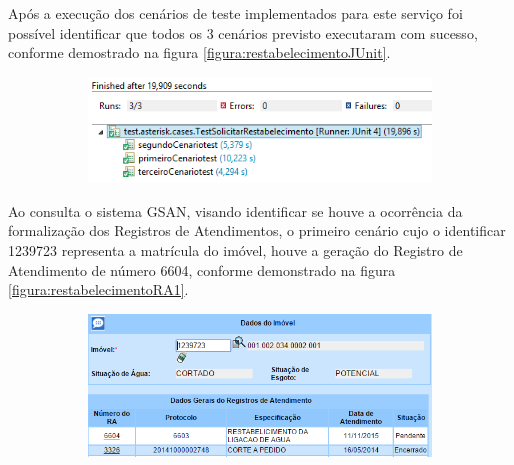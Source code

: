  Após a execução dos cenários de teste implementados para este serviço foi possível identificar que todos os 3 cenários previsto executaram com sucesso, conforme demostrado na figura \ref{figura:restabelecimentoJUnit}.	

\begin{figure}[H]
	\centering
	\caption{Restabelecimento da Ligação de Água - Detalhes execução dos testes}
	\label{figura:restabelecimentoJUnit}
	\begin{subfigure}[H]{\textwidth}
		\centering
		\includegraphics{figuras/cenarios/restabelecimento/junit_result.PNG}
	\end{subfigure}
\end{figure}

Ao consulta o sistema GSAN, visando identificar se houve a ocorrência da formalização dos Registros de Atendimentos, o primeiro cenário cujo o identificar 1239723 representa a matrícula do imóvel, houve a geração do Registro de Atendimento de número 6604, conforme demonstrado na figura \ref{figura:restabelecimentoRA1}.

\begin{figure}[H]
	\centering
	\caption{Restabelecimento da Ligação de Água - RA gerado para o Cenário 1}
	\label{figura:restabelecimentoRA1}
	\begin{subfigure}[H]{\textwidth}
		\centering
		\includegraphics{figuras/cenarios/restabelecimento/resultado_1.PNG}
	\end{subfigure}
\end{figure}



